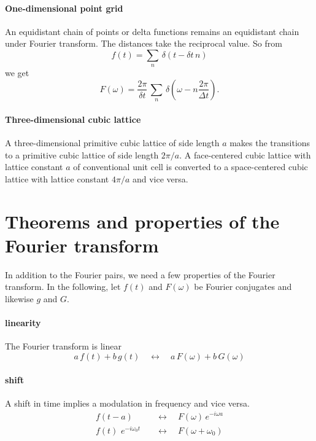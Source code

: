 \paragraph{One-dimensional point grid} An equidistant chain of points or delta functions remains an equidistant chain under Fourier transform. The distances take  the reciprocal value. So from
\begin{equation}
 f(t) = \sum_n \, \delta (t - \delta t \, n)
\end{equation}
we get
\begin{equation}
 F(\omega) = \frac{2 \pi}{\delta t} \, \sum_n \, \delta \left(\omega - n\frac{2 \pi}{\Delta t} \right).
\end{equation}


\paragraph{Three-dimensional cubic lattice} A three-dimensional primitive cubic lattice of side length $a$ makes the transitions to a primitive cubic lattice of side length $2 \pi/a$. A face-centered cubic lattice with lattice constant $a$ of conventional unit cell is converted  to a space-centered cubic lattice with lattice constant $4 \pi / a$ and vice versa. 


\section{Theorems and properties of the Fourier transform}

In addition to the Fourier pairs, we need a few properties of the Fourier transform. In the following, let $f(t)$ and $F(\omega)$ be Fourier conjugates and likewise $g$ and $G$.

\paragraph{linearity} The Fourier transform is linear
\begin{equation}
a \, f(t) + b \, g(t) \quad \leftrightarrow \quad 
a \, F(\omega) + b \, G(\omega) 
\end{equation}

\paragraph{shift} A shift in time implies a modulation in frequency and vice versa.
\begin{align}
 f(t - a) & \quad \leftrightarrow \quad 
F(\omega) \, e^{-i \omega a} \\
 f(t) \, \, e^{-i \omega_0 t} & \quad \leftrightarrow \quad 
F(\omega + \omega_0)  
\end{align}


